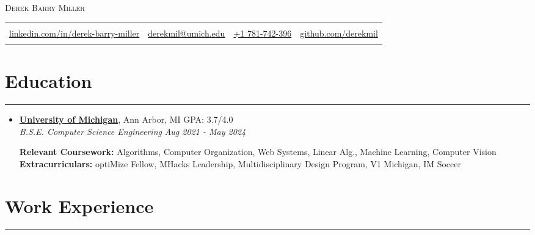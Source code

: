 \documentclass[10pt]{article}
\newcommand{\cussection}[1]{\vspace{-0.3in}\section*{#1}\vspace{-0.15in} \hrule\vspace{0.05in} }
\begin{document}
\thispagestyle{empty}

\begin{center}
{\huge{\scshape{Derek Barry Miller}}}

\begin{tabular*} 
    {\textwidth} 
        {@{\extracolsep{\fill}}lccr}
    	&& \\ 
	    \href{https://www.linkedin.com/in/derek-barry-miller/}{linkedin.com/in/derek-barry-miller}   
	    &    
	    \href{mailto://derekmil@umich.edu}{derekmil@umich.edu} 
	    &
            \href{te:7817423996}{+1 781-742-396}
            &
	    \href{https://github.com/derekmil}{github.com/derekmil}
                
	   
\\
    
\arrayrulecolor{gray}
\hline\hline 
\end{tabular*} 
\end{center}

{\centering 
\par}


\cussection{Education}
\begin{itemize}
    \item \href{https://cse.engin.umich.edu/}{\textbf{University of Michigan}}, Ann Arbor, MI \hfill 
    GPA: 3.7/4.0
    \\ \textit{B.S.E. Computer Science Engineering} \hfill
    \textit{Aug 2021 - May 2024}
    
    \textbf{Relevant Coursework:}  Algorithms, Computer Organization, Web Systems, Linear Alg., Machine Learning, Computer Vision
      \\ \textbf{Extracurriculars:} optiMize Fellow, MHacks Leadership, Multidisciplinary Design Program, V1 Michigan, IM Soccer

\end{itemize}


\cussection{Work Experience} 

    \vspace{5pt}
\end{document}
